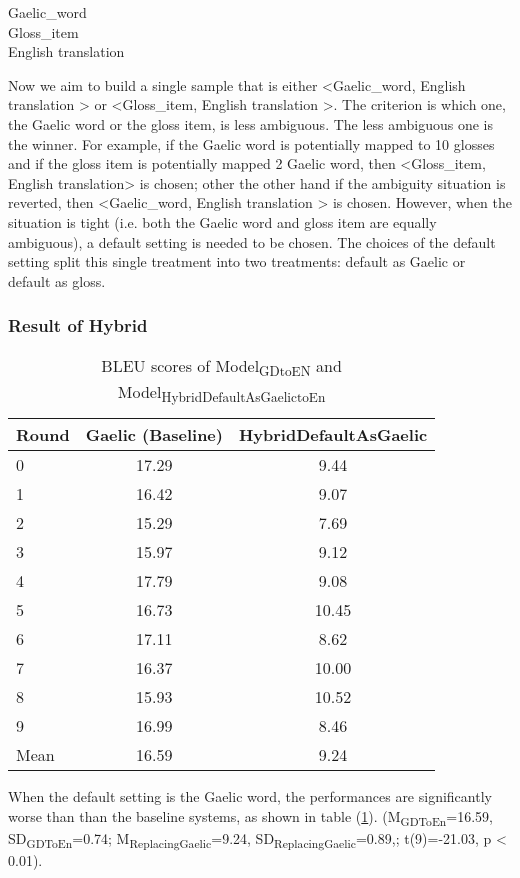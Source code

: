 \documentclass[final]{ua-thesis}
\numberwithin{equation}{section}
\begin{document}
\begin{exe} 
\ex 
	\gll	 Gaelic\_word\\  
     		 Gloss\_item \\
    \glt    English translation  
\end{exe} 

Now we aim to build a single sample that is either <Gaelic\_word, English translation > or <Gloss\_item, English translation >. The criterion is which one, the Gaelic word or the gloss item, is less ambiguous. The less ambiguous one is the winner. For example, if the Gaelic word is potentially mapped to 10 glosses and if the gloss item is potentially mapped 2 Gaelic word, then <Gloss\_item, English translation> is chosen; other the other hand if the ambiguity situation is reverted, then <Gaelic\_word, English translation > is chosen. However, when the situation is tight (i.e. both the Gaelic word and gloss item are equally ambiguous), a default setting is needed to be chosen. The choices of the default setting split this single treatment into two treatments: default as Gaelic or default as gloss.
\subsubsection{Result of Hybrid}    
\begin{table}[ht]
\centering
\begin{tabular}{lcc}
  \hline
Round & Gaelic (Baseline) & HybridDefaultAsGaelic \\ 
  \hline
0 & 17.29 & 9.44 \\ 
  1 & 16.42 & 9.07 \\ 
  2 & 15.29 & 7.69 \\ 
  3 & 15.97 & 9.12 \\ 
  4 & 17.79 & 9.08 \\ 
  5 & 16.73 & 10.45 \\ 
  6 & 17.11 & 8.62 \\ 
  7 & 16.37 & 10.00 \\ 
  8 & 15.93 & 10.52 \\ 
  9 & 16.99 & 8.46 \\ 
   \hline
Mean & 16.59 & 9.24 \\ 
   \hline
\end{tabular}
\caption{BLEU scores of Model\textsubscript{GDtoEN} and Model\textsubscript{HybridDefaultAsGaelictoEn}} 
\label{Table:HybridDefaultAsGaelic}
\end{table}When the default setting is the Gaelic word, the performances are significantly worse than than the baseline systems, as shown in table (\ref{Table:HybridDefaultAsGaelic}).  
(M\textsubscript{GDToEn}=16.59, SD\textsubscript{GDToEn}=0.74; M\textsubscript{ReplacingGaelic}=9.24, SD\textsubscript{ReplacingGaelic}=0.89,; t(9)=-21.03, p < 0.01).
\end{document}
